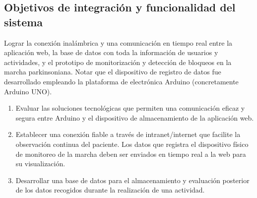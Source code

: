 \subsection{Objetivos de integración y funcionalidad del sistema}
Lograr la conexión inalámbrica y una comunicación en tiempo real entre la aplicación web, la base de datos con toda la información de usuarios y actividades, y el prototipo de monitorización y detección de bloqueos en la marcha parkinsoniana. Notar que el dispositivo de registro de datos fue desarrollado empleando la plataforma de electrónica Arduino (concretamente Arduino UNO).
\begin{enumerate}
    \item Evaluar las soluciones tecnológicas que permiten una comunicación eficaz y segura entre Arduino y el dispositivo de almacenamiento de la aplicación web.
    \item Establecer una conexión fiable a través de intranet/internet que facilite la observación continua del paciente. Los datos que registra el dispositivo físico de monitoreo de la marcha deben ser enviados en tiempo real a la web para su visualización. 
    \item Desarrollar una base de datos para el almacenamiento y evaluación posterior de los datos recogidos durante la realización de una actividad.
\end{enumerate}














